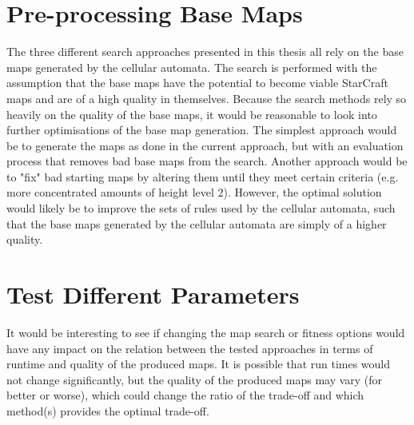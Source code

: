 \section{Pre-processing Base Maps}
\label{futurework_preprocess}
The three different search approaches presented in this thesis all rely on the base maps generated by the cellular automata. The search is performed with the assumption that the base maps have the potential to become viable StarCraft maps and are of a high quality in themselves. Because the search methods rely so heavily on the quality of the base maps, it would be reasonable to look into further optimisations of the base map generation. The simplest approach would be to generate the maps as done in the current approach, but with an evaluation process that removes bad base maps from the search. Another approach would be to "fix" bad starting maps by altering them until they meet certain criteria (e.g. more concentrated amounts of height level 2). However, the optimal solution would likely be to improve the sets of rules used by the cellular automata, such that the base maps generated by the cellular automata are simply of a higher quality.

\section{Test Different Parameters}
\label{futurework_differentparameters}
It would be interesting to see if changing the map search or fitness options would have any impact on the relation between the tested approaches in terms of runtime and quality of the produced maps. It is possible that run times would not change significantly, but the quality of the produced maps may vary (for better or worse), which could change the ratio of the trade-off and which method(s) provides the optimal trade-off.